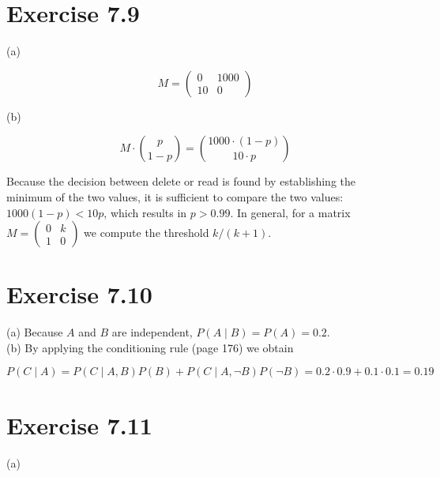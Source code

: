 \documentclass[10pt]{article}
\begin{document}
\section*{Exercise 7.9}
(a)

$$
M=\left(\begin{array}{cc}
0 & 1000 \\
10 & 0
\end{array}\right)
$$

(b)

$$
M \cdot\binom{p}{1-p}=\binom{1000 \cdot(1-p)}{10 \cdot p}
$$

Because the decision between delete or read is found by establishing the minimum of the two values, it is sufficient to compare the two values: $1000(1-p)<10 p$, which results in $p>0.99$. In general, for a matrix $M=\left(\begin{array}{ll}0 & k \\ 1 & 0\end{array}\right)$ we compute the threshold $k /(k+1)$.

\section*{Exercise 7.10}
(a) Because $A$ and $B$ are independent, $P(A \mid B)=P(A)=0.2$.\\
(b) By applying the conditioning rule (page 176) we obtain

$$
P(C \mid A)=P(C \mid A, B) P(B)+P(C \mid A, \neg B) P(\neg B)=0.2 \cdot 0.9+0.1 \cdot 0.1=0.19
$$

\section*{Exercise 7.11}
(a)
\end{document}
